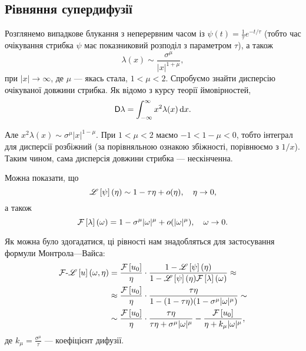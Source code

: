 \subsection{Рівняння супердифузії}

Розглянемо випадкове блукання з неперервним часом із $\psi(t) = \frac{1}{\tau} e^{-t/\tau}$ (тобто час очікування стрибка $\psi$ має показниковий розподіл з параметром $\tau$), а також
\begin{equation}
    \lambda(x) \sim \frac{\sigma^\mu}{|x|^{1 + \mu}}, 
\end{equation}
при $|x| \to \infty$, де $\mu$ --- якась стала, $1 < \mu < 2$. Спробуємо знайти дисперсію очікуваної довжини стрибка. Як відомо з курсу теорії ймовірностей,
\begin{equation}
    \mathsf{D} \lambda = \int_{-\infty}^\infty x^2 \lambda(x) \mathop{}\!\mathrm{d} x.
\end{equation}

Але $x^2 \lambda(x) \sim \sigma^\mu |x|^{1 - \mu}$. При $1 < \mu < 2$ маємо $-1 < 1 - \mu < 0$, тобто інтеграл для дисперсії розбіжний (за порівняльною ознакою збіжності, порівнюємо з $1/x$). Таким чином, сама дисперсія довжини стрибка --- нескінченна. \medskip

Можна показати, що
\begin{equation}
    \mathscr{L}\left[\psi\right](\eta) \sim 1 - \tau \eta + o(\eta), \quad \eta \to 0,
\end{equation}
а також
\begin{equation}
    \mathcal{F}\left[\lambda\right](\omega) = 1 - \sigma^\mu |\omega|^\mu + o(|\omega|^\mu), \quad \omega \to 0.
\end{equation}

Як можна було здогадатися, ці рівності нам знадобляться для застосування формули Монтрола---Вайса:
\begin{equation}
    \begin{aligned}
        \mathcal{F}\text{-}\mathscr{L}\left[u\right](\omega, \eta)
        &= \frac{\mathcal{F}\left[u_0\right]}{\eta} \cdot \frac{1 - \mathscr{L}\left[\psi\right](\eta)}{1 - \mathscr{L}\left[\psi\right](\eta) \mathcal{F}\left[\lambda\right](\omega)} \approx \\
        &\approx \frac{\mathcal{F}\left[u_0\right]}{\eta} \cdot \frac{\tau \eta}{1 - (1 - \tau \eta) (1 - \sigma^\mu |\omega|^\mu)} \sim \\
        &\sim \frac{\mathcal{F}\left[u_0\right]}{\eta} \cdot \frac{\tau \eta}{\tau \eta + \sigma^\mu |\omega|^\mu} - \frac{\mathcal{F}\left[u_0\right]}{\eta + k_\mu |\omega|^\mu},
    \end{aligned}
\end{equation}
де $k_\mu = \frac{\sigma^\mu}{\tau}$ --- коефіцієнт дифузії. \medskip

